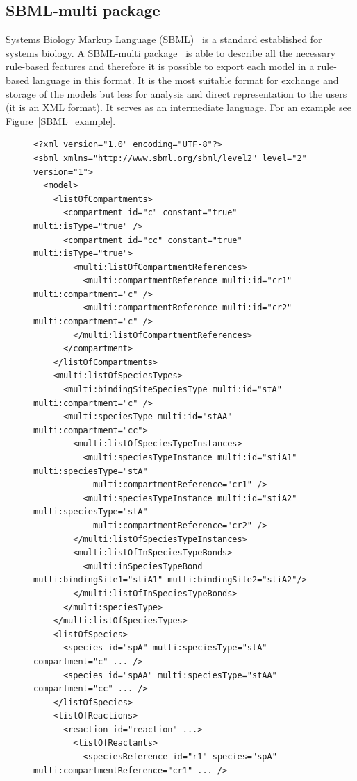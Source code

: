 \documentclass[11pt,a4paper]{report}
\begin{document}
\subsection{SBML-multi package}

Systems Biology Markup Language (SBML)~\cite{hucka2003systems} is a standard established for systems biology. A SBML-multi package~\cite{SBMLmulti} is able to describe all the necessary rule-based features and therefore it is possible to export each model in a rule-based language in this format. It is the most suitable format for exchange and storage of the models but less for analysis and direct representation to the users (it is an XML format). It serves as an intermediate language. For an example see Figure~\ref{SBML_example}.

\begin{figure}[!h]
\lstset{language=XML}
\begin{lstlisting}[basicstyle=\scriptsize, frame=single]
<?xml version="1.0" encoding="UTF-8"?>
<sbml xmlns="http://www.sbml.org/sbml/level2" level="2" version="1">
  <model>
    <listOfCompartments>
      <compartment id="c" constant="true" multi:isType="true" />
      <compartment id="cc" constant="true" multi:isType="true">
        <multi:listOfCompartmentReferences>
          <multi:compartmentReference multi:id="cr1" multi:compartment="c" />
          <multi:compartmentReference multi:id="cr2" multi:compartment="c" />
        </multi:listOfCompartmentReferences>
      </compartment>
    </listOfCompartments>
    <multi:listOfSpeciesTypes>
      <multi:bindingSiteSpeciesType multi:id="stA" multi:compartment="c" />
      <multi:speciesType multi:id="stAA" multi:compartment="cc">
        <multi:listOfSpeciesTypeInstances>
          <multi:speciesTypeInstance multi:id="stiA1" multi:speciesType="stA"
            multi:compartmentReference="cr1" />
          <multi:speciesTypeInstance multi:id="stiA2" multi:speciesType="stA"
            multi:compartmentReference="cr2" />
        </multi:listOfSpeciesTypeInstances>
        <multi:listOfInSpeciesTypeBonds>
          <multi:inSpeciesTypeBond multi:bindingSite1="stiA1" multi:bindingSite2="stiA2"/>
        </multi:listOfInSpeciesTypeBonds>
      </multi:speciesType>
    </multi:listOfSpeciesTypes>
    <listOfSpecies>
      <species id="spA" multi:speciesType="stA" compartment="c" ... />
      <species id="spAA" multi:speciesType="stAA" compartment="cc" ... />
    </listOfSpecies>
    <listOfReactions>
      <reaction id="reaction" ...>
        <listOfReactants>
          <speciesReference id="r1" species="spA" multi:compartmentReference="cr1" ... />

\end{lstlisting}
\end{figure}
\end{document}

